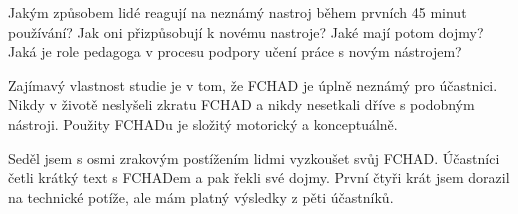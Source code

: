 Jakým způsobem lidé reagují na neznámý nastroj během prvních 45 minut používání?  Jak oni přizpůsobují k novému nastroje?  Jaké mají potom dojmy? Jaká je role pedagoga v procesu podpory učení práce s novým nástrojem?

Zajímavý vlastnost studie je v tom, že FCHAD je úplně neznámý pro účastnici.  Nikdy v životě neslyšeli zkratu FCHAD a nikdy nesetkali dříve s podobným nástroji.  Použity FCHADu je složitý motorický a konceptuálně.

Seděl jsem s osmi zrakovým postížením lidmi vyzkoušet svůj FCHAD. Účastníci četli krátký text s FCHADem a pak řekli své dojmy.  První čtyři krát jsem dorazil na technické potíže, ale mám platný výsledky z pěti účastníků.
